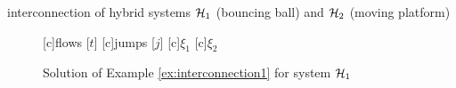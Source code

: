\begin{example}{interconnection of hybrid systems $\mathcal{H}_1$ (bouncing ball) and $\mathcal{H}_2$ (moving platform)}
\begin{figure}[ht]
  \centering
  [c]{flows [$t$]}
  [c]{jumps [$j$]}
  [c]{$\xi_1$}
  [c]{$\xi_2$}
\qquad
{}
\caption{Solution of Example \ref{ex:interconnection1} for system $\mathcal{H}_1$}
\end{figure}

%


\end{example}
